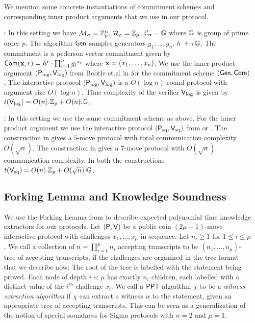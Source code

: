 We mention some concrete instantiations of commitment schemes and corresponding inner product arguments that we use in our protocol.

: In this setting we have $\mathcal{M}_\sigma=\mathbb{Z}^n_p$, $\mathcal{R}_\sigma=\mathbb{Z}_p$, $\mathcal{C}_\sigma=\mathbb{G}$ where $\mathbb{G}$ is group of prime order $p$. The algorithm $\mathsf{Gen}$ samples generators $g_1,\ldots,g_n$, $h$ $\hskip2.3pt{\gets\!\!\mbox{\tiny${\$}$\normalsize}}\, \mathbb{G}$. The commitment is a pederson vector commitment given by $\mathsf{Com}({\bf x } ,r ) = h^r \cdot \prod_{i=1}^n {g_i}^{x_i}$ where ${\bf x}=(x_1,\ldots,x_n)$. We use the inner product argument $(\mathsf{P}_\mathrm{log},\mathsf{V}_\mathrm{log})$ from Bootle et.al in \cite{bulletproofs} for the commitment scheme $(\mathsf{Gen},\mathsf{Com})$. The interactive protocol $(\mathsf{P}_\mathrm{log},\mathsf{V}_\mathrm{log})$ is a $O(\log n)$ round protocol with argument size $O(\log n)$. Time complexity of the verifier $\mathsf{V}_\mathrm{log}$ is given by $t(\mathsf{V}_\mathrm{log})=O(n).\mathbb{Z}_p + O(n).\mathbb{G}$.\smallskip


: In this setting we use the same commitment scheme as above. For the inner product argument we use the interactive protocol $(\mathsf{P}_\mathrm{sq},\mathsf{V}_\mathrm{sq})$ from \cite{InnerProductDLS} or \cite{Groth09b}. The construction in \cite{InnerProductDLS} gives a $5$-move protocol with total communication complexity $O(\sqrt{n})$. The construction in \cite{Groth09b} gives a 7-move protocol with $O(\sqrt{n})$ communication complexity. In both the constructions $t(\mathsf{V}_\mathrm{sq}) = O(n).\mathbb{Z}_p +
O(\sqrt{n}).\mathbb{G}$.

\subsection{Forking Lemma and Knowledge Soundness}
We use the Forking Lemma from \cite{InnerProductDLS,bulletproofs} to describe 
expected polynomial time knowledge extractors for our protocols. Let
$(\mathsf{P},\mathsf{V})$ be a public coin $(2\mu+1)$-move interactive protocol with
challenges $x_1,\ldots,x_\mu$ in sequence. Let $n_i\geq 1$ for $1\leq i\leq
\mu$. We call a collection of $n=\prod_{i=1}^\mu n_i$ accepting transcripts to be
$(n_1,\ldots,n_\mu)$-tree of accepting transcripts, if the challenges are
organized in the tree format that we describe now: The root of the tree is
labelled with the statement being proved. Each node of depth $i<\mu$ has exactly
$n_i$ children, each labelled with a distinct value of the $i^{th}$ challenge
$x_i$. We call a $\mathsf{PPT}$ algorithm $\chi$ to be a {\em witness extraction
algorithm} if $\chi$ can extract a witness $w$ to the statement, given an
appropriate tree of accepting transcripts. This can be seen as a generalization
of the notion of special soundness for Sigma protocols with $n=2$ and $\mu=1$.

